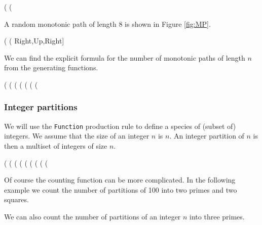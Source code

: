 \documentclass[10pt]{article}
\newcommand{\command}[1]{\texttt{#1}}
\begin{document}
\begin{example}
(%
(%
\end{example}
%
A random monotonic path of length 8 is shown in Figure \ref{fig:MP}.

\begin{example}
(%
(%
       Right,Up,Right]
\end{example}
%
We can find the explicit formula for the number of monotonic paths of
length $n$ from the generating functions.

\begin{example}
(%
(%
(%
(%
(%
(%
(%
\end{example}

\subsubsection{Integer partitions}

We will use the \command{Function} production rule to define a species
of (subset of) integers. We assume that the size of an integer $n$ is
$n$.  An integer partition of $n$ is then a multiset of integers of
size $n$.

\begin{example}
(%
(%
(%
(%
(%
(%
(%
(%
(%
\end{example}
%
Of course the counting function can be more complicated. In the
following example we count the number of partitions of 100 into two
primes and two squares.

%
We can also count the number of partitions of an integer $n$ into
three primes.
\end{document}
